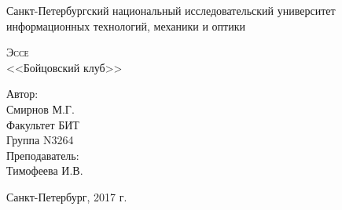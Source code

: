 \begin{titlepage}
	\begin{center}
		\large
			
		Санкт-Петербургский национальный исследовательский университет информационных технологий, механики и оптики
		\vspace{0.25cm}
		
		
		\vfill
		\textsc{Эссе}\\[5mm]
		
		<<Бойцовский клуб>>

		
	\end{center}
	\vfill
	
	\begin{flushright}
Автор:\\
Смирнов М.Г.\\
Факультет БИТ\\
Группа N3264\\
Преподаватель:\\
Тимофеева И.В.

	\end{flushright}
	\vfill
	\begin{center}
		Санкт-Петербург, 2017 г.
	\end{center}
\end{titlepage}